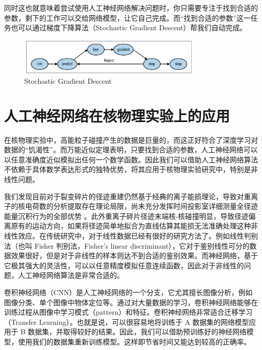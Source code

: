 \documentclass[AutoFakeBold]{LZUThesis}
\begin{document}
同时这也就意味着尝试使用人工神经网络解决问题时，你只需要专注于找到合适的参数，剩下的工作可以交给网络模型，让它自己完成。而“找到合适的参数”这一任务也可以通过梯度下降算法（Stochastic Gradient Descent）帮我们自动完成。

\begin{figure}[H]
    \centering
    \includegraphics[width=0.8\textwidth]{figures/SGD.png}
    \caption{Stochastic Gradient Descent}
    \label{fig_SGD}
\end{figure}






\section{人工神经网络在核物理实验上的应用}
在核物理实验中，高能粒子碰撞产生的数据是巨量的，而这正好符合了深度学习对数据的“饥渴性”。而万能近似定理表明，只要找到合适的参数，人工神经网络可以以任意准确度近似模拟出任何一个数学函数。因此我们可以借助人工神经网络算法不依赖于具体数学表达形式的独特优势，将其应用于核物理实验研究中，特别是非线性问题。

我们发现目前对于裂变碎片的径迹重建仍然基于经典的离子能损理论，导致对重离子的核电荷数的分析提取存在理论局限，尚未充分发挥时间投影室详细测量全径迹能量沉积行为的全部优势 \cite{魏康2019基于GEM工艺的裂变时间投影室中裂变碎片的讨论}。此外重离子碎片径迹末端核-核碰撞明显，导致径迹偏离原有的运动方向，如果将径迹简单地拟合为直线估算其能损无法准确处理这种非线性效应。在传统研究中，对于线性数据已经有很好的研究方法了。例如线性判别法（也叫 Fisher 判别法，Fisher's linear discriminant）\cite{fisher1936use}，它对于鉴别线性可分的数据效果很好，但是对于非线性的样本则达不到合适的鉴别效果。而神经网络，基于它极其强大的灵活性，可以以任意精度模拟任意连续函数，因此对于非线性的问题，人工神经网络算法是非常合适的。

卷积神经网络（CNN）是人工神经网络的一个分支，它尤其擅长图像分析，例如图像分类、单个图像中物体定位等。通过对大量数据的学习，卷积神经网络能够在训练过程从图像中学习模式（pattern）和特征。卷积神经网络非常适合迁移学习（Transfer Learning）。也就是说，可以很容易地将训练于 A 数据集的网络模型应用于 B 数据集，并取得较好的结果。因此，我们可以借助预训练好的神经网络模型，使用我们的数据集重新训练模型。这样即节省时间又能达到较高的正确率。
\end{document}
